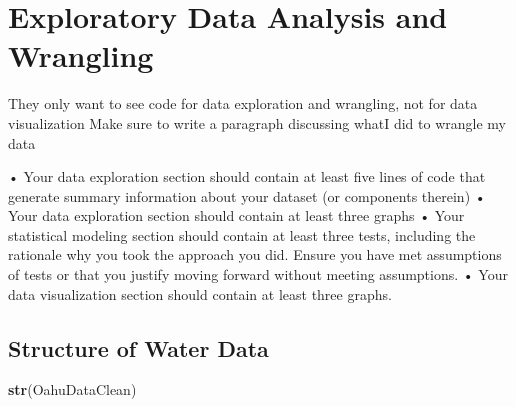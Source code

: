 \documentclass[12pt,]{article}
\newenvironment{Shaded}{\begin{snugshade}}{\end{snugshade}}
\newcommand{\KeywordTok}[1]{\textcolor[rgb]{0.13,0.29,0.53}{\textbf{#1}}}
\newcommand{\NormalTok}[1]{#1}
\begin{document}
\newpage

\section{Exploratory Data Analysis and
Wrangling}\label{exploratory-data-analysis-and-wrangling-1}

They only want to see code for data exploration and wrangling, not for
data visualization Make sure to write a paragraph discussing whatI did
to wrangle my data

• Your data exploration section should contain at least five lines of
code that generate summary information about your dataset (or components
therein) • Your data exploration section should contain at least three
graphs • Your statistical modeling section should contain at least three
tests, including the rationale why you took the approach you did. Ensure
you have met assumptions of tests or that you justify moving forward
without meeting assumptions. • Your data visualization section should
contain at least three graphs.

\subsection{Structure of Water Data}\label{structure-of-water-data}

\begin{Shaded}
\begin{Highlighting}[]
\KeywordTok{str}\NormalTok{(OahuDataClean)}
\end{Highlighting}
\end{Shaded}
\end{document}
